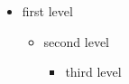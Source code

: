\documentclass[10pt]{beamer}
\begin{document}
\begin{frame}
\begin{itemize}
\item first level
    \begin{itemize}
    \item second level
        \begin{itemize}
        \item third level
        \end{itemize}
    \end{itemize}
\end{itemize}
\end{frame}
\end{document}
